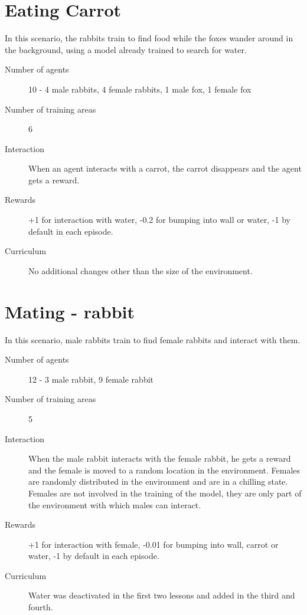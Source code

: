 \section{Eating Carrot}
In this scenario, the rabbits train to find food while the foxes wander around in the background, using a model already trained to search for water.
\begin{description}
    \item[Number of agents] 10 - 4 male rabbits, 4 female rabbits, 1 male fox, 1 female fox
    \item[Number of training areas] 6
    \item[Interaction] When an agent interacts with a carrot, the carrot disappears and the agent gets a reward.
    \item[Rewards] +1 for interaction with water, -0.2 for bumping into wall or water, -1 by default in each episode.
    \item[Curriculum] No additional changes other than the size of the environment.
\end{description}

\section{Mating - rabbit}
In this scenario, male rabbits train to find female rabbits and interact with them.
\begin{description}
    \item[Number of agents] 12 - 3 male rabbit, 9 female rabbit
    \item[Number of training areas] 5
    \item[Interaction] When the male rabbit interacts with the female rabbit, he gets a reward and the female is moved to a random location in the environment. Females are randomly distributed in the environment and are in a chilling state. Females are not involved in the training of the model, they are only part of the environment with which males can interact.
    \item[Rewards] +1 for interaction with female, -0.01 for bumping into wall, carrot or water, -1 by default in each episode.
    \item[Curriculum] Water was deactivated in the first two lessons and added in the third and fourth.
\end{description}

